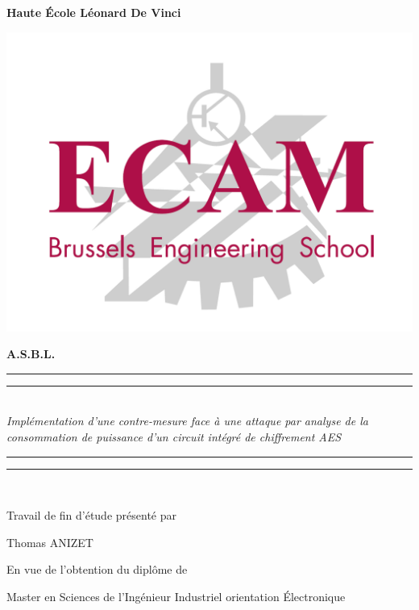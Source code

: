 \documentclass[oneside]{book}
\begin{document}
\thispagestyle{empty}

\vspace{2cm}
\begin{center}
	\centerline{\textbf{Haute École Léonard De Vinci}}
	\includegraphics[scale=0.15]{logos/logo-ecam.png}\\
	\centerline{\textbf{A.S.B.L.}}
	\vspace{3cm}

	\rule[0.5ex]{\linewidth}{2pt}\vspace*{-\baselineskip}\vspace*{3.2pt}
	\rule[0.5ex]{\linewidth}{1pt}\\[\baselineskip]
	{\Large \textit{Implémentation d'une contre-mesure face à une attaque par analyse de la consommation de puissance d'un circuit intégré de chiffrement AES}}\\
	\vspace{4mm}
	\rule[0.5ex]{\linewidth}{1pt}\vspace*{-\baselineskip}\vspace*{4pt}
	\rule[0.5ex]{\linewidth}{2pt}\\[\baselineskip]

\end{center}

\vspace{5cm}
      \begin{flushright} \large
        Travail de fin d'étude présenté par 

        Thomas ANIZET
        
        En vue de l'obtention du diplôme de
        
        Master en Sciences de l’Ingénieur Industriel orientation Électronique
      \end{flushright}
\vspace{9mm}
\end{document}
